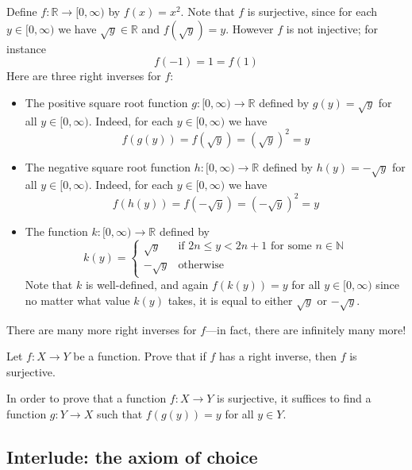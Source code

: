 \begin{example}
Define $f : \mathbb{R} \to [0,\infty)$ by $f(x)=x^2$. Note that $f$ is surjective, since for each $y \in [0,\infty)$ we have $\sqrt{y} \in \mathbb{R}$ and $f(\sqrt{y}) = y$. However $f$ is not injective; for instance
\[ f(-1) = 1 = f(1) \]
Here are three right inverses for $f$:
\begin{itemize}
\item The positive square root function $g : [0,\infty) \to \mathbb{R}$ defined by $g(y)=\sqrt{y}$ for all $y \in [0,\infty)$. Indeed, for each $y \in [0,\infty)$ we have
\[ f(g(y)) = f(\sqrt{y}) = (\sqrt{y})^2 = y \]
\item The negative square root function $h : [0,\infty) \to \mathbb{R}$ defined by $h(y)=-\sqrt{y}$ for all $y \in [0,\infty)$. Indeed, for each $y \in [0,\infty)$ we have
\[ f(h(y)) = f(-\sqrt{y}) = (-\sqrt{y})^2 = y \]
\item The function $k : [0,\infty) \to \mathbb{R}$ defined by
\[ k(y) = \begin{cases}
\sqrt{y} & \text{if } 2n \le y < 2n+1 \text{ for some } n \in \mathbb{N} \\
-\sqrt{y} & \text{otherwise}
\end{cases} \]
Note that $k$ is well-defined, and again $f(k(y)) = y$ for all $y \in [0,\infty)$ since no matter what value $k(y)$ takes, it is equal to either $\sqrt{y}$ or $-\sqrt{y}$.
\end{itemize}
There are many more right inverses for $f$---in fact, there are infinitely many more!
\end{example}

\begin{exercise}
Let $f : X \to Y$ be a function. Prove that if $f$ has a right inverse, then $f$ is surjective.
\end{exercise}

\begin{strategy}
In order to prove that a function $f : X \to Y$ is surjective, it suffices to find a function $g : Y \to X$ such that $f(g(y)) = y$ for all $y \in Y$.
\end{strategy}

\subsection*{Interlude: the axiom of choice}

